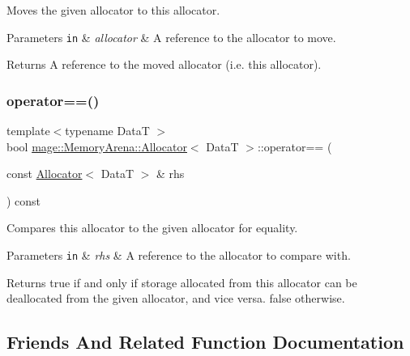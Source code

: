 Moves the given allocator to this allocator.


\begin{DoxyParams}[1]{Parameters}
\mbox{\tt in}  & {\em allocator} & A reference to the allocator to move. \\
\hline
\end{DoxyParams}
\begin{DoxyReturn}{Returns}
A reference to the moved allocator (i.\+e. this allocator). 
\end{DoxyReturn}
\hypertarget{structmage_1_1_memory_arena_1_1_allocator_a5f81981cef3395ffdf4217ba28d86c72}{}\label{structmage_1_1_memory_arena_1_1_allocator_a5f81981cef3395ffdf4217ba28d86c72} 
\subsubsection{\texorpdfstring{operator==()}{operator==()}}
{\footnotesize\ttfamily template$<$typename DataT $>$ \\
bool \hyperlink{structmage_1_1_memory_arena_1_1_allocator}{mage\+::\+Memory\+Arena\+::\+Allocator}$<$ DataT $>$\+::operator== (\begin{DoxyParamCaption}\item[{const \hyperlink{structmage_1_1_memory_arena_1_1_allocator}{Allocator}$<$ DataT $>$ \&}]{rhs }\end{DoxyParamCaption}) const\hspace{0.3cm}{\ttfamily [noexcept]}}

Compares this allocator to the given allocator for equality.


\begin{DoxyParams}[1]{Parameters}
\mbox{\tt in}  & {\em rhs} & A reference to the allocator to compare with. \\
\hline
\end{DoxyParams}
\begin{DoxyReturn}{Returns}
{\ttfamily true} if and only if storage allocated from this allocator can be deallocated from the given allocator, and vice versa. {\ttfamily false} otherwise. 
\end{DoxyReturn}


\subsection{Friends And Related Function Documentation}
\hypertarget{structmage_1_1_memory_arena_1_1_allocator_a934e79307a45b6e72da26d1f10079550}{}\label{structmage_1_1_memory_arena_1_1_allocator_a934e79307a45b6e72da26d1f10079550} 
